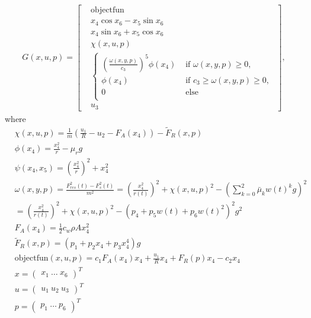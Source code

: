 \documentclass[
10pt, %
a4paper, %
oneside, %
headinclude,footinclude, %
BCOR5mm, %
]{scrartcl}
\begin{document}
\begin{align*}
G(x, u, p) = \begin{bmatrix}
& \text{objectfun} \\
 & x_4 \cos x_6 -  x_5\sin x_6 \\
&  x_4 \sin x_6 +  x_5\cos x_6 \\
&  \chi(x, u, p)\\
&  \begin{cases} \left(\frac{\omega(x, y, p)}{c_3}\right)^5 \phi(x_4) & \text{ if } \omega(x, y, p)\geq 0,\\
\phi( x_4)  & \text{ if } c_3 \geq \omega(x, y, p) \geq 0, \\
0 &   \text{ else } \\
\end{cases}\\
 & u_3
\end{bmatrix},
\end{align*}
where 
\begin{align*}
&\chi(x, u, p)= \frac{1}{m}\left( \frac{u_1}{R} - u_2 - F_A(x_4)\right) -\tilde{F}_R(x, p)\\
&\phi( x_4) = \frac{x_4^2}{r}  -  \mu_r g \\
&\psi(x_4, x_5) = \left(\frac{x_4^2}{r}\right)^2+ x_4^2\\
& \omega(x, y, p) = \frac{F_{res}^2(t)- F_{s}^2(t)}{m^2} = \left(\frac{x_4^2}{r(t)}\right)^2+ \chi(x, u, p)^2 -\left(\sum_{k=0}^2 \bar{\mu}_k w(t)^k g\right)^2  \\
& = \left(\frac{x_4^2}{r(t)}\right)^2+ \chi(x, u, p)^2 -\left(p_4 + p_5 w(t) + p_6 w(t)^2 \right)^2 g^2  \\
& F_A(x_4) = \frac{1}{2}  c_w  \rho  A x_4^2 \\
&\tilde{F}_R(x, p) = \left(p_{1} + p_2 x_4 + p_3 x_4^4 \right) g \\
 &\text{objectfun}(x, u, p) = c_1 F_A(x_4) x_4 + \frac{u_1}{R}x_4 + F_R(p)x_4 -c_2 x_4\\
&x = \begin{pmatrix}
x_1 \ \ldots \ x_6
\end{pmatrix}^T \\
&u = \begin{pmatrix}
u_1 \ u_2 \ u_3 
\end{pmatrix}^T \\
&p = \begin{pmatrix}
p_1 \ \ldots \ p_6
\end{pmatrix}^T
\end{align*}
\end{document}

